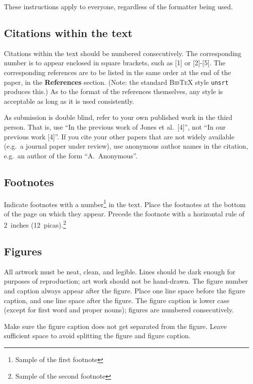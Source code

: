 \documentclass{article} %
\begin{document}
These instructions apply to everyone, regardless of the formatter being used.

\subsection{Citations within the text}

Citations within the text should be numbered consecutively. The corresponding
number is to appear enclosed in square brackets, such as [1] or [2]-[5]. The
corresponding references are to be listed in the same order at the end of the
paper, in the \textbf{References} section. (Note: the standard
\textsc{Bib\TeX} style \texttt{unsrt} produces this.) As to the format of the
references themselves, any style is acceptable as long as it is used
consistently.

As submission is double blind, refer to your own published work in the
third person. That is, use ``In the previous work of Jones et al.\ [4]'',
not ``In our previous work [4]''. If you cite your other papers that
are not widely available (e.g.\ a journal paper under review), use
anonymous author names in the citation, e.g.\ an author of the
form ``A.\ Anonymous''.


\subsection{Footnotes}

Indicate footnotes with a number\footnote{Sample of the first footnote} in the
text. Place the footnotes at the bottom of the page on which they appear.
Precede the footnote with a horizontal rule of 2~inches
(12~picas).\footnote{Sample of the second footnote}

\subsection{Figures}

All artwork must be neat, clean, and legible. Lines should be dark
enough for purposes of reproduction; art work should not be
hand-drawn. The figure number and caption always appear after the
figure. Place one line space before the figure caption, and one line
space after the figure. The figure caption is lower case (except for
first word and proper nouns); figures are numbered consecutively.

Make sure the figure caption does not get separated from the figure.
Leave sufficient space to avoid splitting the figure and figure caption.
\end{document}
